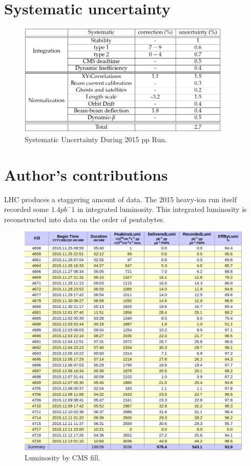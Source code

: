 \section{Systematic uncertainty}

\begin{figure}[h!]
\begin{centering}
\includegraphics[width=4in]{Chapter4/importfigs/CMS-PAS-LUM-15-001_Table_001.png}
\par\end{centering}
\caption{Systematic Uncertainty During 2015 pp Run. \label{fig:sysLumiError}}
\end{figure}


\section{Author's contributions}

LHC produces a staggering amount of data. The 2015 heavy-ion run itself recorded some $1.4 pb^-1$ in integrated luminosity. This integrated luminosity is reconstructed into data on the order of pentabytes. 
\begin{figure}[h!]
\begin{centering}
\includegraphics[width=6in]{Chapter4/importfigs/lumiFill.png}
\par\end{centering}
\caption{Luminosity by CMS fill. \label{fig:lumiFill}}
\end{figure}

